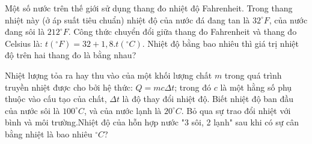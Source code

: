 \begin{ex}
Một số nước trên thế giới sử dụng thang đo nhiệt độ Fahrenheit. Trong thang nhiệt này (ở áp suất tiêu chuẩn) nhiệt độ của nước đá đang tan là $32^\circ F$, của nước đang sôi là $212^\circ F$. Công thức chuyển đổi giữa thang đo Fahrenheit và thang đo Celsius là: $t(^\circ F) = 32 + 1,8.t(^\circ C)$. Nhiệt độ bằng bao nhiêu thì giá trị nhiệt độ trên hai thang đo là bằng nhau?
\loigiai{}
\end{ex}

\begin{ex}
{
}
\loigiai{}
\end{ex}

\begin{ex}
Nhiệt lượng tỏa ra hay thu vào của một khối lượng chất $m$ trong quá trình truyền nhiệt được cho bởi hệ thức: $Q = mc\Delta t$; trong đó $c$ là một hằng số phụ thuộc vào cấu tạo của chất, $\Delta t$ là độ thay đổi nhiệt độ. Biết nhiệt độ ban đầu của nước sôi là $100^\circ C$, và của nước lạnh là $20^\circ C$. Bỏ qua sự trao đổi nhiệt với bình và môi trường.Nhiệt độ của hỗn hợp nước "3 sôi, 2 lạnh" sau khi có sự cân bằng nhiệt là bao nhiêu $^\circ C$?
\loigiai{}
\end{ex}

